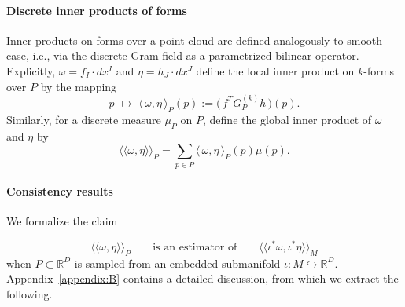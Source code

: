\documentclass{article}
\newcommand{\R}{\mathbb{R}}
\newcommand{\llangle}{\langle \! \langle}
\newcommand{\rrangle}{\rangle \! \rangle}
\newcommand{\jake}[1]{}
\newcommand{\kelly}[1]{}
\theoremstyle{remark}
\theoremstyle{plain}
\begin{document}
\paragraph{Discrete inner products of forms} Inner products on forms over a point cloud are defined analogously to smooth case, i.e., via the discrete Gram field as a parametrized bilinear operator. Explicitly,  $\omega = f_I \cdot dx^I$ and $\eta = h_J \cdot dx^J$ define the local inner product on $k$-forms over $P$ by the mapping
\begin{equation} \label{def:gramfield-innerproduct}
    p \, \, \mapsto \, \,  \big\langle \, \omega, \eta \, \big\rangle_P(p) := \Big(\, f^T G_P^{(k)} h\, \Big)(p).
\end{equation} Similarly, for a discrete measure $\mu_P$ on $P$, define the global inner product of $\omega$ and $\eta$ by
\begin{equation}
\label{def:gramfield-global-inner-product}
    \llangle \omega, \eta \rrangle_P = \sum_{p \in P} \langle \, \omega, \eta \, \rangle_P(p) \mu(p).
\end{equation}


\paragraph{Consistency results} We formalize the claim 

\begin{equation}
    \llangle \omega ,\eta \rrangle_P \qquad \text{is an estimator of} \qquad \llangle \iota^*\omega, \iota^*\eta\rrangle_M
\end{equation} when $P \subset \R^D$ is sampled from an embedded submanifold $\iota : M \hookrightarrow \R^D$. Appendix~\ref{appendix:B} contains a detailed discussion, from which we extract the following. 
\end{document}
